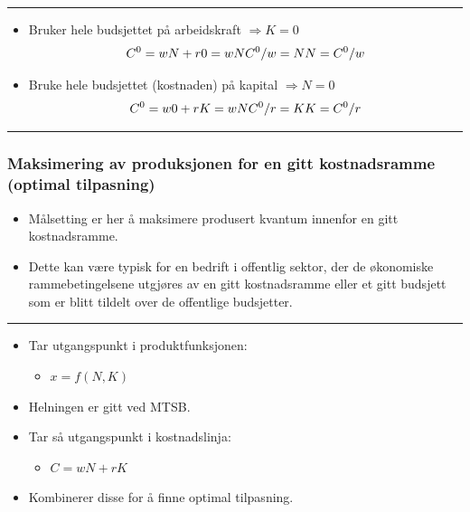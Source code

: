 \documentclass[
  letterpaper,
  DIV=11,
  numbers=noendperiod]{scrartcl}
\providecommand{\tightlist}{%
  \setlength{\itemsep}{0pt}\setlength{\parskip}{0pt}}\usepackage{longtable,booktabs,array}
\begin{document}
\begin{center}\rule{0.5\linewidth}{0.5pt}\end{center}

\begin{itemize}
\tightlist
\item
  Bruker hele budsjettet på arbeidskraft \(\Rightarrow K=0\)
  \begin{equation}
  C^0= wN + r0 = wN \\
  C^0/w = N \\
  N = C^0/w 
  \end{equation}
\item
  Bruke hele budsjettet (kostnaden) på kapital \(\Rightarrow N=0\)
  \begin{equation}
  C^0= w0 + rK = wN \\
  C^0/r = K \\
  K = C^0/r 
  \end{equation}
\end{itemize}

\begin{center}\rule{0.5\linewidth}{0.5pt}\end{center}

\subsubsection{Maksimering av produksjonen for en gitt kostnadsramme
(optimal
tilpasning)}\label{maksimering-av-produksjonen-for-en-gitt-kostnadsramme-optimal-tilpasning}

\begin{itemize}
\tightlist
\item
  Målsetting er her å maksimere produsert kvantum innenfor en gitt
  kostnadsramme.
\item
  Dette kan være typisk for en bedrift i offentlig sektor, der de
  økonomiske rammebetingelsene utgjøres av en gitt kostnadsramme eller
  et gitt budsjett som er blitt tildelt over de offentlige budsjetter.
\end{itemize}

\begin{center}\rule{0.5\linewidth}{0.5pt}\end{center}

\begin{itemize}
\tightlist
\item
  Tar utgangspunkt i produktfunksjonen:

  \begin{itemize}
  \tightlist
  \item
    \(x = f(N, K)\)
  \end{itemize}
\item
  Helningen er gitt ved MTSB.
\item
  Tar så utgangspunkt i kostnadslinja:

  \begin{itemize}
  \tightlist
  \item
    \(C = wN + rK\)
  \end{itemize}
\item
  Kombinerer disse for å finne optimal tilpasning.
\end{itemize}
\end{document}
